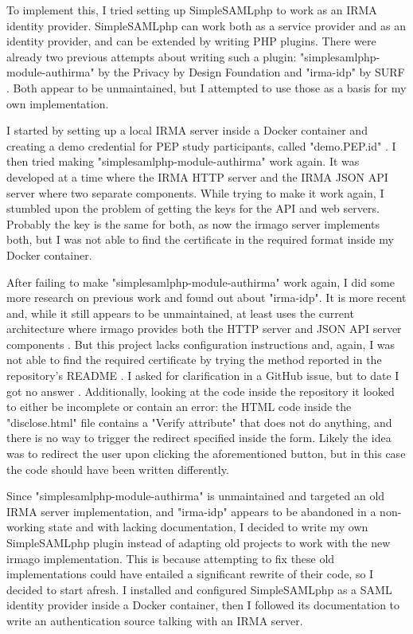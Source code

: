 \documentclass{report}
\begin{document}
To implement this, I tried setting up SimpleSAMLphp \cite{simplesamlphp} to work as an IRMA \cite{about-irma} identity provider. SimpleSAMLphp can work both as a service provider and
as an identity provider, and can be extended by writing PHP plugins. There were already two previous attempts about writing such a plugin: 
"simplesamlphp-module-authirma" \cite{simplesamlphp-module-authirma} by the Privacy by Design Foundation \cite{privacybydesignfoundation} and "irma-idp" \cite{irma-idp} by SURF \cite{surf}.
Both appear to be unmaintained, but I attempted to use those as a basis for my own implementation. \par
I started by setting up a local IRMA server inside a Docker container and creating a demo credential for PEP study participants, called "demo.PEP.id" . I
then tried making "simplesamlphp-module-authirma" work again. It was developed at a time where the IRMA HTTP server and the IRMA JSON API server where two separate components. While
trying to make it work again, I stumbled upon the problem of getting the keys for the API and web servers. Probably the key is the same for both, as now the irmago
server \cite{irma-docs-server} implements both, but I was not able to find the certificate in the required format inside my Docker container. \par
After failing to make "simplesamlphp-module-authirma" work again, I did some more research on previous work and found out about "irma-idp". It is more recent and, while it still
appears to be unmaintained, at least uses the current architecture where irmago provides both the HTTP server and JSON API server components \cite{irma-docs-server}. But this
project lacks configuration instructions and, again, I was not able to find the required certificate by trying the method reported in the repository's README \cite{irma-idp}. I asked for 
clarification in a GitHub issue, but to date I got no answer \cite{irma-idp-issue}. Additionally, looking at the code inside the repository it looked to either be incomplete or
contain an error: the HTML code inside the "disclose.html" file contains a "Verify attribute" that does not do anything, and there is no way to trigger the redirect specified
inside the form. Likely the idea was to redirect the user upon clicking the aforementioned button, but in this case the code should have been written differently. \par
Since "simplesamlphp-module-authirma" is unmaintained and targeted an old IRMA server implementation, and "irma-idp" appears to be abandoned in a non-working state and with lacking
documentation, I decided to write my own SimpleSAMLphp plugin instead of adapting old projects to work with the new irmago implementation. This is because attempting to fix these
old implementations could have entailed a significant rewrite of their code, so I decided to start afresh. I installed and configured SimpleSAMLphp \cite{simplesamlphp-docs} as a SAML identity
provider \cite{sstc-saml-core-errata-2.0-wd-07} inside a Docker container, then I followed its documentation to write an authentication source talking with an IRMA server. 
\end{document}
